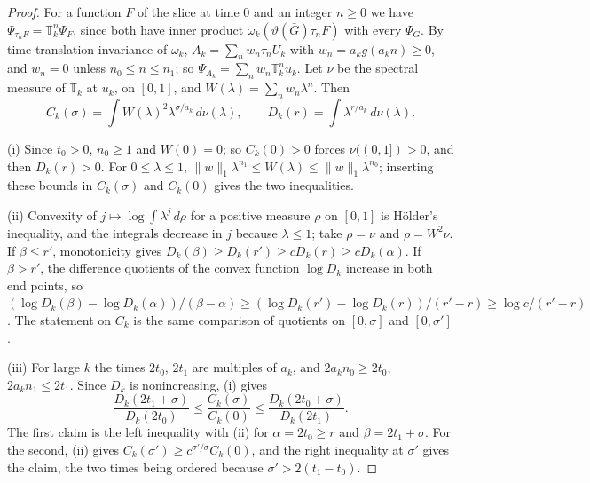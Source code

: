 \documentclass[11pt]{amsart}
\theoremstyle{definition}
\theoremstyle{remark}
\numberwithin{equation}{section}
\begin{document}
\begin{proof}
For a function $F$ of the slice at time $0$ and an integer $n\ge0$ we have
$\Psi_{\tau_nF}=\mathbb T_k^n\Psi_F$, since both have inner product
$\omega_k(\vartheta(\bar G)\tau_nF)$ with every $\Psi_G$. By time translation
invariance of $\omega_k$,
$A_k=\sum_nw_n\tau_nU_k$ with $w_n=a_kg(a_kn)\ge0$, and $w_n=0$ unless
$n_0\le n\le n_1$; so $\Psi_{A_k}=\sum_nw_n\mathbb T_k^nu_k$. Let $\nu$ be the
spectral measure of $\mathbb T_k$ at $u_k$, on $[0,1]$, and
$W(\lambda)=\sum_nw_n\lambda^n$. Then
\[
C_k(\sigma)=\int W(\lambda)^2\lambda^{\sigma/a_k}\,d\nu(\lambda),\qquad
D_k(r)=\int\lambda^{r/a_k}\,d\nu(\lambda).
\]

(i) Since $t_0>0$, $n_0\ge1$ and $W(0)=0$; so $C_k(0)>0$ forces $\nu((0,1])>0$, and then
$D_k(r)>0$. For $0\le\lambda\le1$,
$\|w\|_1\lambda^{n_1}\le W(\lambda)\le\|w\|_1\lambda^{n_0}$; inserting these
bounds in $C_k(\sigma)$ and $C_k(0)$ gives the two inequalities.

(ii) Convexity of $j\mapsto\log\int\lambda^j\,d\rho$ for a positive measure
$\rho$ on $[0,1]$ is H\"older's inequality, and the integrals decrease in $j$
because $\lambda\le1$; take $\rho=\nu$ and $\rho=W^2\nu$. If
$\beta\le r'$, monotonicity gives
$D_k(\beta)\ge D_k(r')\ge cD_k(r)\ge cD_k(\alpha)$. If $\beta>r'$, the
difference quotients of the convex function $\log D_k$ increase in both
end points, so $(\log D_k(\beta)-\log D_k(\alpha))/(\beta-\alpha)\ge
(\log D_k(r')-\log D_k(r))/(r'-r)\ge\log c/(r'-r)$. The
statement on $C_k$ is the same comparison of quotients on $[0,\sigma]$ and
$[0,\sigma']$.

(iii) For large $k$ the times $2t_0$, $2t_1$ are multiples of $a_k$, and
$2a_kn_0\ge2t_0$, $2a_kn_1\le2t_1$. Since $D_k$ is nonincreasing, (i) gives
\[
\frac{D_k(2t_1+\sigma)}{D_k(2t_0)}\le\frac{C_k(\sigma)}{C_k(0)}\le
\frac{D_k(2t_0+\sigma)}{D_k(2t_1)} .
\]
The first claim is the left inequality with (ii) for $\alpha=2t_0\ge r$ and
$\beta=2t_1+\sigma$. For the second, (ii) gives $C_k(\sigma')\ge
c^{\sigma'/\sigma}C_k(0)$, and the right inequality at $\sigma'$ gives the
claim, the two times being ordered because $\sigma'>2(t_1-t_0)$.
\end{proof}
\end{document}

